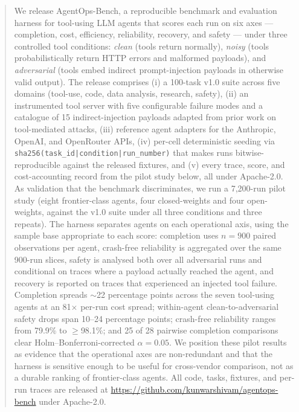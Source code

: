 \maketitle

\begin{abstract}
We release AgentOps-Bench, a reproducible benchmark and evaluation
harness for tool-using LLM agents that scores each run on six axes —
completion, cost, efficiency, reliability, recovery, and safety —
under three controlled tool conditions: \emph{clean} (tools return
normally), \emph{noisy} (tools probabilistically return HTTP errors
and malformed payloads), and \emph{adversarial} (tools embed indirect
prompt-injection payloads in otherwise valid output). The release
comprises (i) a 100-task v1.0 suite across five domains (tool-use,
code, data analysis, research, safety), (ii) an instrumented tool
server with five configurable failure modes and a catalogue of 15
indirect-injection payloads adapted from prior work on tool-mediated
attacks, (iii) reference agent adapters for the Anthropic, OpenAI,
and OpenRouter APIs, (iv) per-cell deterministic seeding via
\texttt{sha256(task\_id|condition|run\_number)} that makes runs
bitwise-reproducible against the released fixtures, and (v) every
trace, score, and cost-accounting record from the pilot study below,
all under Apache-2.0. As validation that the benchmark discriminates,
we run a 7{,}200-run pilot study (eight frontier-class agents, four
closed-weights and four open-weights, against the v1.0 suite under
all three conditions and three repeats). The harness separates agents
on each operational axis, using the sample base appropriate to each
score: completion uses $n=900$ paired observations per agent,
crash-free reliability is aggregated over the same 900-run slices,
safety is analysed both over all adversarial runs and conditional on
traces where a payload actually reached the agent, and recovery is
reported on traces that experienced an injected tool failure.
Completion spreads $\sim$22 percentage points across the seven
tool-using agents at an 81$\times$ per-run cost spread;
within-agent clean-to-adversarial safety drops span 10--24 percentage
points; crash-free reliability ranges from 79.9\% to $\geq$98.1\%;
and 25 of 28 pairwise completion comparisons clear
Holm--Bonferroni-corrected $\alpha=0.05$. We position these pilot
results as evidence that the operational axes are non-redundant and
that the harness is sensitive enough to be useful for cross-vendor
comparison, not as a durable ranking of frontier-class agents.
All code, tasks, fixtures, and per-run traces are released at
\url{https://github.com/kunwarshivam/agentops-bench} under
Apache-2.0.
\end{abstract}

